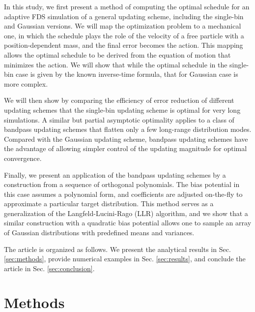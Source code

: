\documentclass[reprint, superscriptaddress, floatfix]{revtex4-1}
\begin{document}
In this study,
we first present a method of computing
the optimal schedule
for an adaptive FDS simulation
of a general updating scheme,
including the single-bin and Gaussian versions.
%
We will map the optimization problem to a mechanical one,
in which the schedule plays the role of the velocity of
a free particle with a position-dependent mass,
and the final error becomes the action.
%
This mapping allows the optimal schedule
to be derived from the equation of motion
that minimizes the action.
%
%
We will show that
while the optimal schedule in the single-bin case
is given by the known inverse-time formula,
that for Gaussian case is more complex.

We will then show by comparing
the efficiency of error reduction
of different updating schemes
that
the single-bin updating scheme
is optimal for very long simulations.
%
A similar but partial asymptotic optimality applies to
a class of bandpass updating schemes
that flatten only
a few long-range distribution modes.
%
Compared with the Gaussian updating scheme,
bandpass updating schemes have the advantage of allowing
simpler control of the updating magnitude
for optimal convergence.

Finally, we present an application of
the bandpass updating schemes
by a construction from
a sequence of orthogonal polynomials.
%
The bias potential in this case assumes
a polynomial form,
and coefficients are adjusted on-the-fly
to approximate a particular target distribution.
%
This method serves
as a generalization of the Langfeld-Lucini-Rago (LLR)
algorithm\cite{langfeld2012, pellegrini2014},
and we show that
a similar construction with
a quadratic bias potential\cite{neuhaus2006, *neuhaus2007, zhu2012}
allows one to sample an array of Gaussian distributions
with predefined means and variances.

The article is organized as follows.
%
We present the analytical results in Sec. \ref{sec:methods},
provide numerical examples
in Sec. \ref{sec:results},
and conclude the article
in Sec. \ref{sec:conclusion}.




\section{\label{sec:methods}
Methods}
\end{document}
